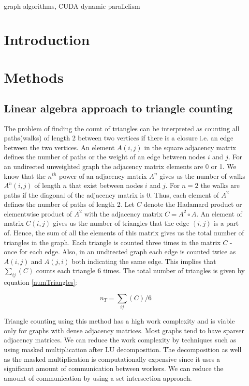 \documentclass[conference]{IEEEtran}
\begin{document}
\begin{IEEEkeywords}
graph algorithms, CUDA dynamic parallelism
\end{IEEEkeywords}

\section{Introduction}


\section{Methods}
\subsection{Linear algebra approach to triangle counting}
The problem of finding the count of triangles can be interpreted as counting all paths(walks) of length 2 between two vertices if there is a closure i.e. an edge between the two vertices. An element $A(i,j)$ in the square adjacency matrix defines the number of paths or the weight of an edge between nodes $i$ and $j$. For an undirected unweighted graph the adjacency matrix elements are 0 or 1. We know that the $n^{th}$ power of an adjacency matrix $A^n$ gives us the number of walks $A^n(i,j)$ of length $n$ that exist between nodes $i$ and $j$. For $n=2$ the walks are paths if the diagonal of the adjacency matrix is 0. Thus, each element of $A^2$ defines the number of paths of length 2. Let $C$ denote the Hadamard product or elementwise product of $A^2$ with the adjacency matrix $C=A^2\circ A$. An element of matrix $C(i,j)$ gives us the number of triangles that the edge $(i,j)$ is a part of. Hence, the sum of all the elements of this matrix gives us the total number of triangles in the graph. Each triangle is counted three times in the matrix $C$ - once for each edge. Also, in an undirected graph each edge is counted twice as $A(i,j)$ and $A(j,i)$ both indicating the same edge. This implies that $\sum_{ij}(C)$ counts each triangle $6$ times. The total number of triangles is given by equation \ref{numTriangles}:

\begin{equation}
 n_{T} = \sum_{ij}(C)/6 \label{numTriangles}
\end{equation}

Triangle counting using this method has a high work complexity and is viable only for graphs with dense adjacency matrices. Most graphs tend to have sparser adjacency matrices. We can reduce the work complexity by techniques such as using masked multiplication after LU decomposition\cite{b10}. The decomposition as well as the masked multiplication is computationally expensive since it uses a significant amount of communication between workers. We can reduce the amount of communication by using a set intersection approach.
\end{document}

